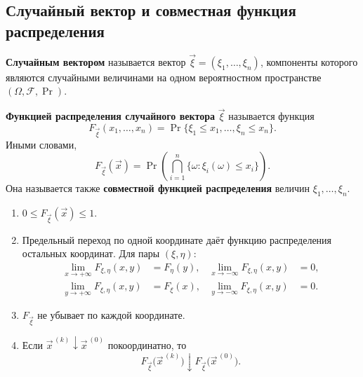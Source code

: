 \clearpage
\begingroup
{}
\everymath{\textstyle}
\subsection{Случайный вектор и совместная функция распределения}

\begin{definition}
    \textbf{Случайным вектором} называется вектор
    $\vec\xi=(\xi_1,\ldots,\xi_n)$, компоненты которого являются
    случайными величинами на одном вероятностном пространстве
    $(\Omega,\mathcal F,\Pr)$.
\end{definition}

\begin{definition}
    \textbf{Функцией распределения случайного вектора} $\vec\xi$
    называется функция
    \[
        F_{\vec\xi}(x_1,\ldots,x_n)
        =\Pr\{\xi_1\leq x_1,\ldots,\xi_n\leq x_n\}.
    \]
    Иными словами,
    \[
        F_{\vec\xi}(\vec x)
        =\Pr\left(\bigcap_{i=1}^{n}\{\omega:\xi_i(\omega)\leq x_i\}\right).
    \]
    Она называется также \textbf{совместной функцией распределения}
    величин $\xi_1,\ldots,\xi_n$.
\end{definition}

\begin{theorem}
    \begin{enumerate}
        \item $0\leq F_{\vec\xi}(\vec x)\leq1$.
        \item Предельный переход по одной координате даёт функцию
        распределения остальных координат. Для пары $(\xi,\eta)$:
        \[
            \begin{aligned}
                \lim_{x\to+\infty}F_{\xi,\eta}(x,y)&=F_\eta(y),&
                \lim_{x\to-\infty}F_{\xi,\eta}(x,y)&=0,\\
                \lim_{y\to+\infty}F_{\xi,\eta}(x,y)&=F_\xi(x),&
                \lim_{y\to-\infty}F_{\xi,\eta}(x,y)&=0.
            \end{aligned}
        \]
        \item $F_{\vec\xi}$ не убывает по каждой координате.
        \item Если $\vec x^{\,(k)}\downarrow\vec x^{\,(0)}$
        покоординатно, то
        \[
            F_{\vec\xi}\bigl(\vec x^{\,(k)}\bigr)
            \downarrow F_{\vec\xi}\bigl(\vec x^{\,(0)}\bigr).
        \]
    \end{enumerate}
\end{theorem}

